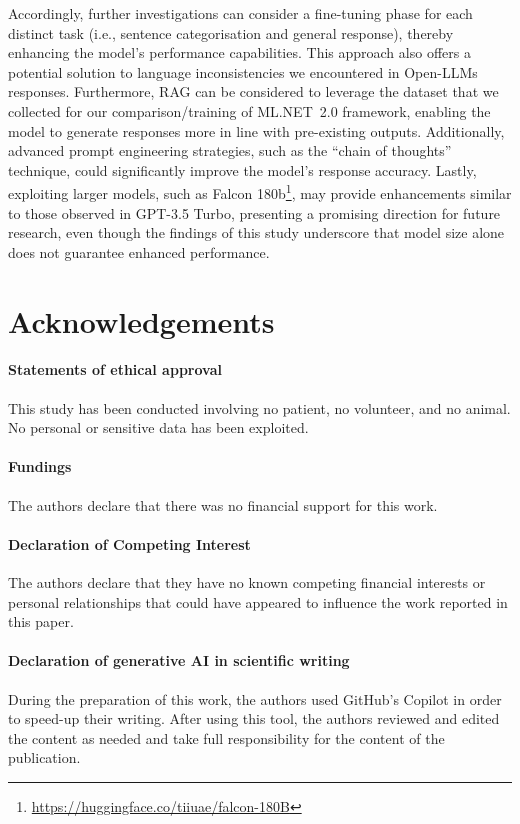 \documentclass[preprint,12pt]{elsarticle}
\begin{document}
Accordingly, further investigations can consider a fine-tuning phase for each distinct task (i.e., sentence categorisation and general response), thereby enhancing the model's performance capabilities. 
%
This approach also offers a potential solution to language inconsistencies we encountered in Open-LLMs responses.
%
Furthermore, RAG can be considered to leverage the dataset that we collected for our comparison/training of ML.NET~2.0 framework, enabling the model to generate responses more in line with pre-existing outputs. Additionally, advanced prompt engineering strategies, such as the ``chain of thoughts''~\cite{wei2022chain} technique, could significantly improve the model's response accuracy. 
%
Lastly, exploiting larger models, such as Falcon 180b\footnote{\url{https://huggingface.co/tiiuae/falcon-180B}}, may provide enhancements similar to those observed in GPT-3.5 Turbo, presenting a promising direction for future research, even though the findings of this study underscore that model size alone does not guarantee enhanced performance.

\section*{Acknowledgements}

\paragraph{Statements of ethical approval}
This study has been conducted involving no patient, no volunteer, and no animal.
%
No personal or sensitive data has been exploited.

\paragraph{Fundings}

The authors declare that there was no financial support for this work.

\paragraph{Declaration of Competing Interest}
%
The authors declare that they have no known competing financial interests or personal relationships that could have appeared to influence the work reported in this paper.

\paragraph{Declaration of generative AI in scientific writing}
%
During the preparation of this work, the authors used GitHub’s Copilot in order to speed-up their writing.
%
After using this tool, the authors reviewed and edited the content as needed and take full responsibility for the content of the publication.
\end{document}
